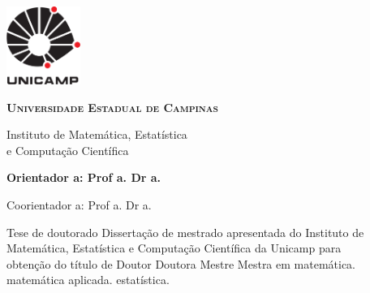 \thispagestyle{plain}
\includegraphics[width=.94in, height=1in,
keepaspectratio=true]{figuras/unicamp-logo}
\begin{center}
  {\large \scshape \bfseries Universidade Estadual de Campinas
  \vspace{.4cm}

  Instituto de Matemática, Estatística \\
  e Computação Científica}
\end{center}
\vspace{.4cm}
\begin{center}
  {\large \scshape \bfseries \autor}
\end{center}
\vspace{.4cm}
\begin{center}
  {\Large\textbf{\textsc{\titulo}}}
\end{center}
\vspace{.8cm}
{\bfseries
\noindent
Orientador\ifx\femaleOrientador\undefined
\else
a\fi: Prof\ifx\femaleOrientador\undefined
\else
a\fi. Dr\ifx\femaleOrientador\undefined
\else
a\fi. \orientador
\vspace{.25cm}

\ifx\coorientador\undefined
\else
\noindent
Coorientador\ifx\femaleCoorientador\undefined
\else
a\fi: Prof\ifx\femaleCoorientador\undefined
\else
a\fi. Dr\ifx\femaleCoorientador\undefined
\else
a\fi. \coorientador
\fi
}

\vspace{.45cm}
\begin{center}
  {\Large \scshape \bfseries \titulopt}
\end{center}

\vspace{.3cm}
\begin{flushright}
  \begin{minipage}[c]{.8\textwidth}
    \begin{flushright}
      \ifx\mestrado\undefined
      Tese de doutorado
      \else
      Dissertação de mestrado
      \fi
      apresentada do Instituto de \\ Matemática,
      Estatística e Computação Científica
      da Unicamp para \\ obtenção do título de
      \ifx\mestrado\undefined
      \ifx\femaleAuthor\undefined
      Doutor
      \else
      Doutora
      \fi
      \else
      \ifx\femaleAuthor\undefined
      Mestre
      \else
      Mestra
      \fi
      \fi
      em
      \ifx\matematica\undefined
      \else
      matemática.
      \fi
      \ifx\aplicada\undefined
      \else
      matemática aplicada.
      \fi
      \ifx\estatistica\undefined
      \else
      estatística.
      \fi
    \end{flushright}
  \end{minipage}
\end{flushright}

